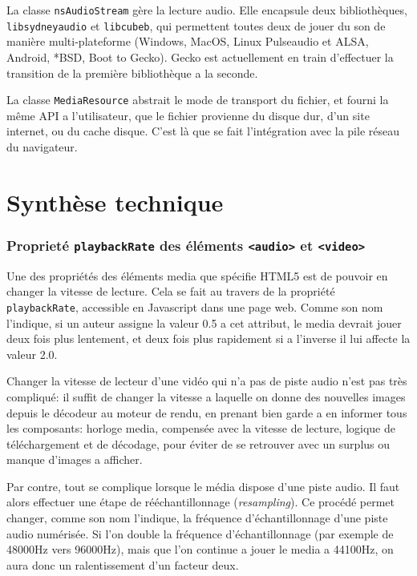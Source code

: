 \documentclass[a4paper,10pt]{article}
\newcommand{\cc}[1]{\texttt{#1}}
\begin{document}
\begin{multicols}{2}
  La classe \cc{nsAudioStream} gère la lecture audio. Elle encapsule deux
  bibliothèques, \cc{libsydneyaudio} et \cc{libcubeb}, qui permettent toutes
  deux de jouer du son de manière multi-plateforme (Windows, MacOS, Linux
  Pulseaudio et ALSA, Android, *BSD, Boot to Gecko). Gecko est actuellement en
  train d'effectuer la transition de la première bibliothèque a la seconde.

  La classe \cc{MediaResource} abstrait le mode de transport du fichier, et
  fourni la même API a l'utilisateur, que le fichier provienne du disque dur,
  d'un site internet, ou du cache disque. C'est là que se fait l'intégration
  avec la pile réseau du navigateur.

  \part{Synthèse technique}
  \section{Proprieté \cc{playbackRate} des éléments \cc{<audio>} et \cc{<video>}}
  Une des propriétés des éléments media que spécifie HTML5 est de pouvoir en
  changer la vitesse de lecture. Cela se fait au travers de la propriété
  \cc{playbackRate}, accessible en Javascript dans une page web. Comme son nom
  l'indique, si un auteur assigne la valeur 0.5 a cet attribut, le media devrait
  jouer deux fois plus lentement, et deux fois plus rapidement si a l'inverse il
  lui affecte la valeur 2.0.

  Changer la vitesse de lecteur d'une vidéo qui n'a pas de piste audio n'est pas
  très compliqué: il suffit de changer la vitesse a laquelle on donne des
  nouvelles images depuis le décodeur au moteur de rendu, en prenant bien garde
  a en informer tous les composants: horloge media, compensée avec la vitesse de
  lecture, logique de téléchargement et de décodage, pour éviter de se retrouver
  avec un surplus ou manque d'images a afficher.

  Par contre, tout se complique lorsque le média dispose d'une piste audio. Il
  faut alors effectuer une étape de rééchantillonnage (\emph{resampling}). Ce
  procédé permet changer, comme son nom l'indique, la fréquence
  d'échantillonnage d'une piste audio numérisée. Si l'on double la fréquence
  d'échantillonnage (par exemple de 48000Hz vers 96000Hz), mais que l'on continue
  a jouer le media a 44100Hz, on aura donc un ralentissement d'un facteur deux.


\end{multicols}
\end{document}
